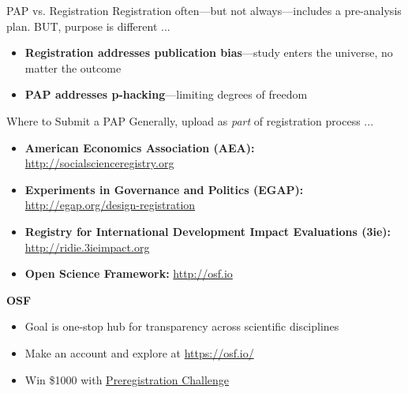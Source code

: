 \documentclass[12pt, compress, handout]{beamer}
\let\noteitem\item %
\renewcommand{\item}{ 
	\noteitem\vspace{\fill}
	}
\begin{document}
	\begin{frame}{PAP vs. Registration}
		Registration often---but not always---includes a pre-analysis plan. BUT, purpose is different ...
		
		\pause	
		\begin{itemize}
			\item \textbf{Registration addresses publication bias}---study enters the universe, no matter the outcome 
			\item \textbf{PAP addresses p-hacking}---limiting degrees of freedom
		\end{itemize}	
		\bigskip
	\end{frame}

	\begin{frame}{Where to Submit a PAP}
		Generally, upload as \textit{part} of registration process ...
		
		\pause
		\begin{itemize}
			\item \textbf{American Economics Association (AEA):} \url{http://socialscienceregistry.org} 
			\item \textbf{Experiments in Governance and Politics (EGAP):} \url{http://egap.org/design-registration}
			\item \textbf{Registry for International Development Impact Evaluations (3ie):} \url{http://ridie.3ieimpact.org}
			\item \textbf{Open Science Framework:} \url{http://osf.io}
		\end{itemize}
	\end{frame}	
		
	\begin{frame}{\textbf{OSF}}
		\begin{itemize}
			\item Goal is one-stop hub for transparency across scientific disciplines
			\item Make an account and explore at \url{https://osf.io/}
			\item Win \$1000 with \href{https://osf.io/prereg/}{Preregistration Challenge}
		\end{itemize}
	\end{frame}
	
\end{document}

